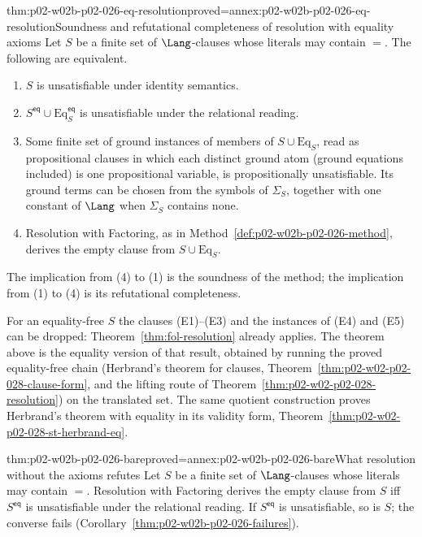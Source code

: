 \begin{hbtheorem}{thm:p02-w02b-p02-026-eq-resolution}{proved=annex:p02-w02b-p02-026-eq-resolution}{Soundness and refutational completeness of resolution with equality axioms}
Let \(S\) be a finite set of \(\Lang\)-clauses whose literals may contain
\(=\).  The following are equivalent.
\begin{enumerate}
  \item \(S\) is unsatisfiable under identity semantics.
  \item \(S^{\mathsf{eq}}\cup\mathrm{Eq}_S^{\mathsf{eq}}\) is unsatisfiable
        under the relational reading.
  \item Some finite set of ground instances of members of
        \(S\cup\mathrm{Eq}_S\), read as propositional clauses in which each
        distinct ground atom (ground equations included) is one
        propositional variable, is propositionally unsatisfiable.  Its ground
        terms can be chosen from the symbols of \(\Sigma_S\), together with
        one constant of \(\Lang\) when \(\Sigma_S\) contains none.
  \item Resolution with Factoring, as in
        Method~\ref{def:p02-w02b-p02-026-method}, derives the empty clause
        from \(S\cup\mathrm{Eq}_S\).
\end{enumerate}
The implication from (4) to (1) is the soundness of the method; the
implication from (1) to (4) is its refutational completeness.
\end{hbtheorem}

For an equality-free \(S\) the clauses (E1)--(E3) and the instances of (E4)
and (E5) can be dropped: Theorem~\ref{thm:fol-resolution} already applies.
The theorem above is the equality version of that result, obtained by
running the proved equality-free chain (Herbrand's theorem for clauses,
Theorem~\ref{thm:p02-w02-p02-028-clause-form}, and the lifting route of
Theorem~\ref{thm:p02-w02-p02-028-resolution}) on the translated set.  The
same quotient construction proves Herbrand's theorem with equality in its
validity form, Theorem~\ref{thm:p02-w02-p02-028-st-herbrand-eq}.

\begin{hbtheorem}{thm:p02-w02b-p02-026-bare}{proved=annex:p02-w02b-p02-026-bare}{What resolution without the axioms refutes}
Let \(S\) be a finite set of \(\Lang\)-clauses whose literals may contain
\(=\).  Resolution with Factoring derives the empty clause from \(S\) iff
\(S^{\mathsf{eq}}\) is unsatisfiable under the relational reading.  If
\(S^{\mathsf{eq}}\) is unsatisfiable, so is \(S\); the converse fails
(Corollary~\ref{thm:p02-w02b-p02-026-failures}).
\end{hbtheorem}

